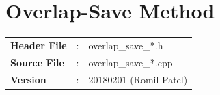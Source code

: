 %
%
\clearpage
\section{Overlap-Save Method}\label{sec:overlapSave}
\begin{refsection}
\begin{tcolorbox}	
	\begin{tabular}{p{2.75cm} p{0.2cm} p{10.5cm}} 	
		\textbf{Header File}   &:&overlap\_save\_*.h \\
		\textbf{Source File}   &:&overlap\_save\_*.cpp \\
		\textbf{Version}       &:& 20180201 (Romil Patel)
	\end{tabular}
\end{tcolorbox}


\end{refsection}
